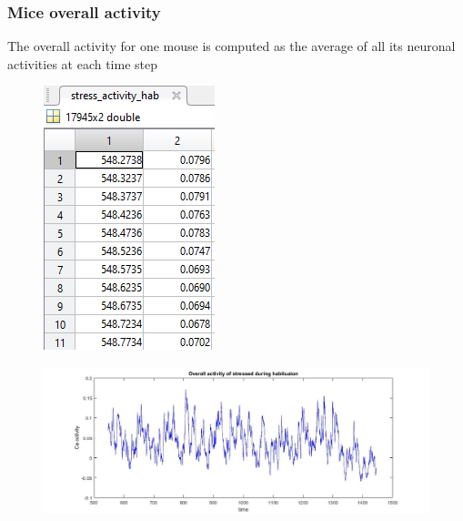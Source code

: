 \documentclass{beamer}
\begin{document}
\begin{frame}
\frametitle{Mice overall activity}

The overall activity for one mouse is computed as the average of all its neuronal activities at each time step

\vspace{1 cm}

	\begin{minipage}{\linewidth}
	\centering
	\begin{minipage}{0.20\linewidth}
		\begin{figure}[H]
			\includegraphics[scale=.50]{overall_data.png}
			
		\end{figure}
	\end{minipage}
	\hspace{0.01 cm}
	\begin{minipage}{0.70\linewidth}
		\begin{figure}[H]
			\includegraphics[scale=.25]{overall_activity.jpg}
			
		\end{figure}
	\end{minipage}
\end{minipage}

\end{frame}	
\end{document}
